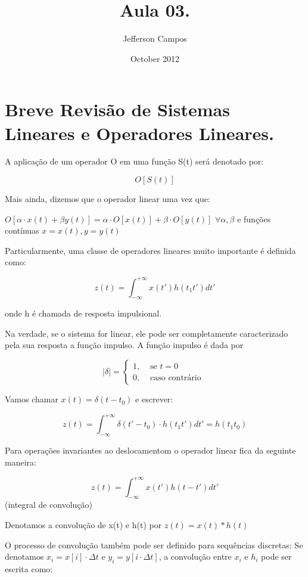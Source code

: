 \documentclass[a4paper,12pt]{article}
\title{Aula 03.}
\author{Jefferson Campos}
\date{October 2012}
\begin{document}

\section{Breve Revisão de Sistemas Lineares e Operadores Lineares.}

A aplicação de um operador O em uma função S(t) será denotado por:

$$ O[S(t)] $$

Mais ainda, dizemos que o operador linear uma vez que:

$ O[\alpha \cdot x(t) + \beta y(t)] = \alpha \cdot O[x(t)] + \beta \cdot O[y(t)] $ $ \forall \alpha,\beta$ e funções contínuas $x = x(t), y= y(t) $

Particularmente, uma classe de operadores lineares muito importante é definida como:

$$ z(t) = \int_{-\infty}^{+\infty }{x(t')h(t_1t') dt'} $$

onde h é chamada de resposta impulsional.

Na verdade, se o sistema for linear, ele pode ser completamente caracterizado pela sua resposta a função impulso. A função impulso é dada por

\begin{equation*}
|\delta|= 
\begin{cases}
1, & \text{ se } t= 0 \\ 
0, & \text{ caso contrário }
\end{cases}
\end{equation*}

Vamos chamar $x(t) = \delta(t - t_0) $ e escrever:

$$ z(t) = \int_{-\infty}^{+\infty }{\delta(t' - t_0) \cdot h(t_1t') dt'} = h(t_1t_0) $$

Para operações invariantes ao deslocamentom o operador linear fica da seguinte maneira:

$$ z(t) = \int_{-\infty}^{+\infty }{x(t') h(t - t') dt'} $$ (integral de convolução)

Denotamos a convolução de x(t) e h(t) por $ z(t) = x(t) \ast h(t) $

O processo de convolução também pode ser definido para sequências discretas: Se denotamos $ x_i = x[i] \cdot \Delta t $ e $ y_i = y[i \cdot \Delta t] $, a convolução entre $ x_i $ e $ h_i $ pode ser escrita como:
\end{document}
